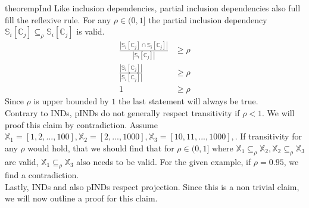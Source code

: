 \begin{restatable}{theorem}{pInd}\label{theo:pInd}
    Like inclusion dependencies, partial inclusion dependencies also full fill the reflexive rule. For any $\rho \in (0, 1]$ the partial inclusion dependency $\mathbb{S}_i[\mathbb{C}_j] \subseteq_{\rho} \mathbb{S}_i[\mathbb{C}_j]$ is valid.
    \begin{align*}
        \frac{|\mathbb{S}_i[\mathbb{C}_j] \cap \mathbb{S}_i[\mathbb{C}_j]|}
            {|\mathbb{S}_i[\mathbb{C}_j]|} & \geq \rho \\
        \frac{|\mathbb{S}_i[\mathbb{C}_j]|}
            {|\mathbb{S}_i[\mathbb{C}_j]|} & \geq \rho \\
            1 & \geq \rho
     \end{align*}
     Since $\rho$ is upper bounded by $1$ the last statement will always be true. \\

     \noindent Contrary to INDs, pINDs do not generally respect transitivity if $\rho < 1$. We will proof this claim by contradiction. Assume $\mathbb{X}_1 = [1, 2, ..., 100], \mathbb{X}_2 = [2, ..., 1000], \mathbb{X}_3 = [10, 11, ..., 1000],$. If transitivity for any $\rho$ would hold, that we should find that for $\rho \in (0, 1]$ where $\mathbb{X}_1 \subseteq_\rho \mathbb{X}_2, \mathbb{X}_2 \subseteq_\rho \mathbb{X}_3$ are valid, $\mathbb{X}_1 \subseteq_\rho \mathbb{X}_3$ also needs to be valid. For the given example, if $\rho = 0.95$, we find a contradiction. \\

     \noindent Lastly, INDs and also pINDs respect projection. Since this is a non trivial claim, we will now outline a proof for this claim.
\end{restatable}

